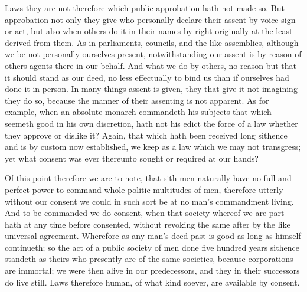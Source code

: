Laws they are not therefore which public approbation hath not made so. But approbation not only they give who personally declare their assent by voice sign or act, but also when others do it in their names by right originally at the least derived from them. As in parliaments, councils, and the like assemblies, although we be not personally ourselves present, notwithstanding our assent is by reason of others agents there in our behalf. And what we do by others, no reason but that it should stand as our deed, no less effectually to bind us than if ourselves had done it in person. In many things assent is given, they that give it not imagining they do so, because the manner of their assenting is not apparent. As for example, when an absolute monarch commandeth his subjects that which seemeth good in his own discretion, hath not his edict the force of a law whether they approve or dislike it? Again, that which hath been received long sithence and is by custom now established, we keep as a law which we may not transgress; yet what consent was ever thereunto sought or required at our hands?

Of this point therefore we are to note, that sith men naturally have no full and perfect power to command whole politic multitudes of men, therefore utterly without our consent we could in such sort be at no man’s commandment living. And to be commanded we do consent, when that society whereof we are part hath at any time before consented, without revoking the same after by the like universal agreement. Wherefore as any man’s deed past is good as long as himself continueth; so the act of a public society of men done five hundred years sithence standeth as theirs who presently are of the same societies, because corporations are immortal; we were then alive in our predecessors, and they in their successors do live still. Laws therefore human, of what kind soever, are available by consent.

